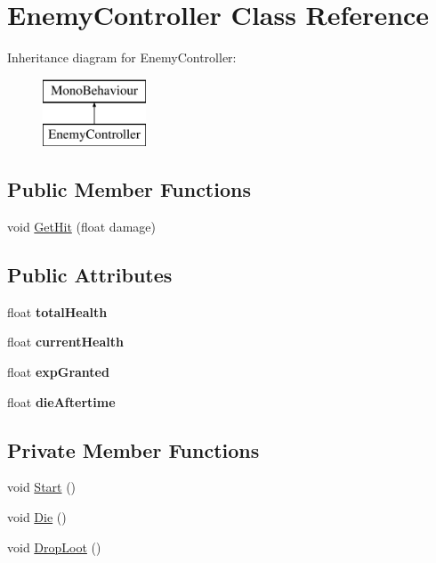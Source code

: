 \hypertarget{class_enemy_controller}{}\section{Enemy\+Controller Class Reference}
\label{class_enemy_controller}
Inheritance diagram for Enemy\+Controller\+:\begin{figure}[H]
\begin{center}
\leavevmode
\includegraphics[height=2.000000cm]{class_enemy_controller}
\end{center}
\end{figure}
\subsection*{Public Member Functions}
\begin{DoxyCompactItemize}
\item 
void \hyperlink{class_enemy_controller_a1aefc89669c41a6353ecf463c937af07}{Get\+Hit} (float damage)
\end{DoxyCompactItemize}
\subsection*{Public Attributes}
\begin{DoxyCompactItemize}
\item 
\mbox{\label{class_enemy_controller_a5c91ac8bc0f622901cb7a48ba787f0bd}} 
float {\bfseries total\+Health}
\item 
\mbox{\label{class_enemy_controller_a7af1c6ac310289274ab51a7c2893fa0b}} 
float {\bfseries current\+Health}
\item 
\mbox{\label{class_enemy_controller_ae505ed595e6b9807cddd599a50c55ad9}} 
float {\bfseries exp\+Granted}
\item 
\mbox{\label{class_enemy_controller_a181f04ac7727efc9ee6d200ad19b0518}} 
float {\bfseries die\+Aftertime}
\end{DoxyCompactItemize}
\subsection*{Private Member Functions}
\begin{DoxyCompactItemize}
\item 
void \hyperlink{class_enemy_controller_aef5af22782327b22749e5632ad7467fb}{Start} ()
\item 
void \hyperlink{class_enemy_controller_aa2585b33cdd57288a0c5a669f188f6ca}{Die} ()
\item 
void \hyperlink{class_enemy_controller_a98b4f2b8c651189ef6b419e6400abc36}{Drop\+Loot} ()
\end{DoxyCompactItemize}
